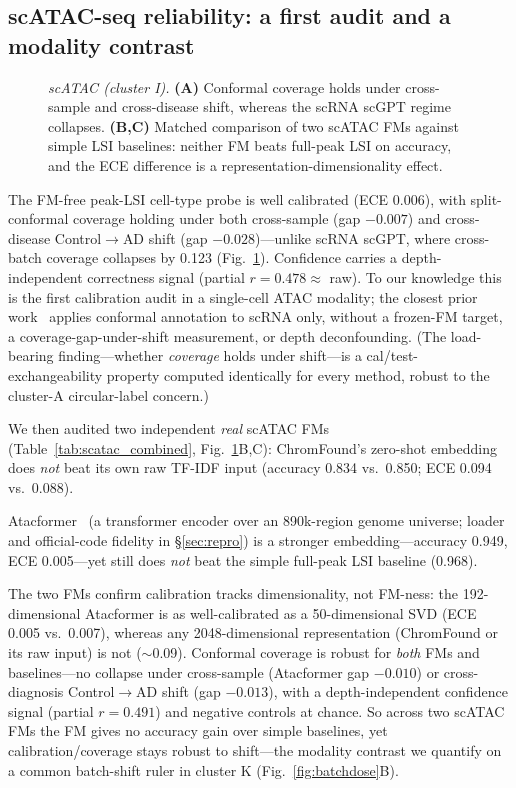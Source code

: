 \documentclass[journal]{IEEEtran}
\begin{document}
\subsection{scATAC-seq reliability: a first audit and a modality contrast}
\begin{figure}[!tbp]\centering
\resizebox{\textwidth}{!}{}
\caption{\emph{scATAC (cluster I).} \textbf{(A)} Conformal coverage holds under cross-sample and cross-disease shift, whereas the scRNA scGPT regime collapses. \textbf{(B,C)} Matched comparison of two scATAC FMs against simple LSI baselines: neither FM beats full-peak LSI on accuracy, and the ECE difference is a representation-dimensionality effect.}\label{fig:scatac}\end{figure}
The FM-free peak-LSI cell-type probe is well calibrated (ECE 0.006), with split-conformal coverage holding under both cross-sample (gap $-0.007$) and cross-disease Control$\to$AD shift (gap $-0.028$)---unlike scRNA scGPT, where cross-batch coverage collapses by 0.123 (Fig.~\ref{fig:scatac}). Confidence carries a depth-independent correctness signal (partial $r=0.478\approx$ raw). To our knowledge this is the first calibration audit in a single-cell ATAC modality; the closest prior work~\cite{lopezdecastro2025} applies conformal annotation to scRNA only, without a frozen-FM target, a coverage-gap-under-shift measurement, or depth deconfounding. (The load-bearing finding---whether \emph{coverage} holds under shift---is a cal/test-exchangeability property computed identically for every method, robust to the cluster-A circular-label concern.)


We then audited two independent \emph{real} scATAC FMs (Table~\ref{tab:scatac_combined}, Fig.~\ref{fig:scatac}B,C): ChromFound's zero-shot embedding does \emph{not} beat its own raw TF-IDF input (accuracy 0.834 vs.\ 0.850; ECE 0.094 vs.\ 0.088).

Atacformer~\cite{atacformer2024} (a transformer encoder over an 890k-region genome universe; loader and official-code fidelity in \S\ref{sec:repro}) is a stronger embedding---accuracy 0.949, ECE 0.005---yet still does \emph{not} beat the simple full-peak LSI baseline (0.968).

The two FMs confirm calibration tracks dimensionality, not FM-ness: the 192-dimensional Atacformer is as well-calibrated as a 50-dimensional SVD (ECE 0.005 vs.\ 0.007), whereas any 2048-dimensional representation (ChromFound or its raw input) is not ($\sim$0.09). Conformal coverage is robust for \emph{both} FMs and baselines---no collapse under cross-sample (Atacformer gap $-0.010$) or cross-diagnosis Control$\to$AD shift (gap $-0.013$), with a depth-independent confidence signal (partial $r=0.491$) and negative controls at chance. So across two scATAC FMs the FM gives no accuracy gain over simple baselines, yet calibration/coverage stays robust to shift---the modality contrast we quantify on a common batch-shift ruler in cluster K (Fig.~\ref{fig:batchdose}B).
\end{document}
